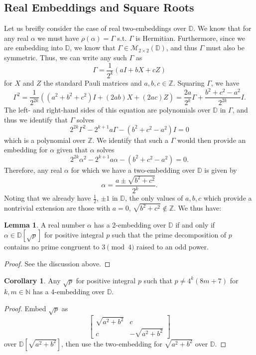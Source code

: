 \documentclass{article}
\theoremstyle{definition}
\theoremstyle{theorem}
\newtheorem{lemma}{Lemma}
\newtheorem{corollary}{Corollary}
\theoremstyle{remark}
\begin{document}
	\subsection{Real Embeddings and Square Roots}
	Let us breifly consider the case of real two-embeddings over $\mathbb{D}$. We know that for any real $\alpha$ we must have $\rho(\alpha) = \Gamma$ s.t. $\Gamma$ is Hermitian. Furthermore, since we are embedding into $\mathbb{D}$, we know that $\Gamma\in\mathcal{M}_{2\times 2}(\mathbb{D})$, and thus $\Gamma$ must also be symmetric. Thus, we can write any such $\Gamma$ as
	\[
		\Gamma = \frac{1}{2^k}\left(a I + b X + c Z \right)
	\]
	for $X$ and $Z$ the standard Pauli matrices and $a,b,c\in\mathbb{Z}$. Squaring $\Gamma$, we have
	\[
		\Gamma^2 = \frac{1}{2^{2k}}\left((a^2+b^2+c^2) I + (2a b) X + (2ac) Z\right) = \frac{2a }{2^k}\Gamma + \frac{b^2+c^2-a^2}{2^{2k}} I.
	\]
	The left- and right-hand sides of this equation are polynomials over $\mathbb{D}$ in $\Gamma$, and thus we identify that $\Gamma$ solves
	\[
		2^{2k} \Gamma^2 - 2^{k+1} a \Gamma - (b^2+c^2-a^2) I = 0
	\]
	which is a polynomial over $\mathbb{Z}$. We identify that such a $\Gamma$ would then provide an embedding for $\alpha$ given that $\alpha$ solves
	\[
		2^{2k} \alpha^2-2^{k+1} a \alpha-(b^2+c^2-a^2)=0.
	\]
	Therefore, any real $\alpha$ for which we have a two-embedding over $\mathbb{D}$ is given by
	\[
		\alpha = \frac{a \pm \sqrt{b^2 + c^2}}{2^k}.
	\]
	Noting that we already have $\frac{1}{2}$, $\pm 1$ in $\mathbb{D}$, the only values of $a,b,c$ which provide a nontrivial extension are those with $a=0$, $\sqrt{b^2 + c^2}\not \in\mathbb{Z}$. We thus have:
	\begin{lemma}
		A real number $\alpha$ has a 2-embedding over $\mathbb{D}$ if and only if $\alpha\in\mathbb{D}[\sqrt{p}]$ for positive integral $p$ such that the prime decomposition of $p$ contains no prime congruent to $3\pmod 4$ raised to an odd power.
	\end{lemma}
	\begin{proof}
		See the discussion above.
	\end{proof}
    
    \begin{corollary}
        Any $\sqrt{p}$ for positive integral $p$ such that $p\neq 4^k(8m+7)$ for $k,m\in\mathbb{N}$ has a 4-embedding over $\mathbb{D}$.
    \end{corollary}
    \begin{proof}
       Embed $\sqrt{p}$ as
       \[
        \begin{bmatrix} \sqrt{a^2+b^2} & c \\ c & -\sqrt{a^2+b^2} \end{bmatrix}
       \]
       over $\mathbb{D}[\sqrt{a^2+b^2}]$, then use the two-embedding for $\sqrt{a^2+b^2}$ over $\mathbb{D}$.
    \end{proof}
    
\end{document}

